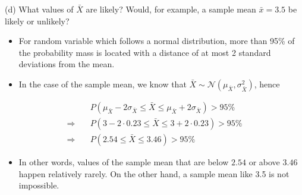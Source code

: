 \documentclass[
  11pt,
  ignorenonframetext,
]{beamer}
\providecommand{\tightlist}{%
  \setlength{\itemsep}{0pt}\setlength{\parskip}{0pt}}
\begin{document}
\begin{frame}{(d) What values of \(\bar{X}\) are likely? Would, for
example, a sample mean \(\bar{x} = 3.5\) be likely or unlikely?}
\protect\hypertarget{d-what-values-of-barx-are-likely-would-for-example-a-sample-mean-barx-3.5-be-likely-or-unlikely}{}
\begin{itemize}
\item
  For random variable which follows a normal distribution, more than
  95\% of the probability mass is located with a distance of at most 2
  standard deviations from the mean.
\item
  In the case of the sample mean, we know that
  \(\bar{X} \sim \mathcal{N}\left(\mu_{\bar X},\sigma^2_{\bar X}\right)\),
  hence
\end{itemize}

\[
\begin{aligned}
&P(\mu_{\bar{X}}-2\sigma_{\bar{X}} \leq \bar{X} \leq \mu_{\bar{X}}+2\sigma_{\bar{X}}) > 95\% \\
\Rightarrow \quad &P(3-2\cdot0.23 \leq \bar{X} \leq 3+2\cdot0.23) > 95\% \\
\Rightarrow \quad &P(2.54 \leq \bar{X} \leq 3.46) > 95\%
\end{aligned}
\]

\begin{itemize}
\tightlist
\item
  In other words, values of the sample mean that are below \(2.54\) or
  above \(3.46\) happen relatively rarely. On the other hand, a sample
  mean like 3.5 is not impossible.
\end{itemize}
\end{frame}
\end{document}

